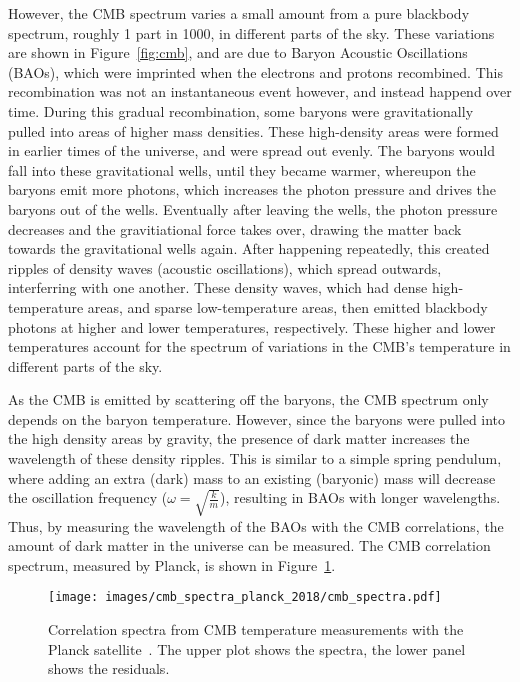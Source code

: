 However, the CMB spectrum varies a small amount from a pure blackbody spectrum, roughly 1 part in 1000, in different parts of the sky.
These variations are shown in Figure~\ref{fig:cmb}, and are due to Baryon Acoustic Oscillations (BAOs), which were imprinted when the electrons and protons recombined.
This recombination was not an instantaneous event however, and instead happend over time.
During this gradual recombination, some baryons were gravitationally pulled into areas of higher mass densities.
These high-density areas were formed in earlier times of the universe, and were spread out evenly.
The baryons would fall into these gravitational wells, until they became warmer, whereupon the baryons emit more photons, which increases the photon pressure and drives the baryons out of the wells.
Eventually after leaving the wells, the photon pressure decreases and the gravitiational force takes over, drawing the matter back towards the gravitational wells again.
After happening repeatedly, this created ripples of density waves (acoustic oscillations), which spread outwards, interferring with one another.
These density waves, which had dense high-temperature areas, and sparse low-temperature areas, then emitted blackbody photons at higher and lower temperatures, respectively.
These higher and lower temperatures account for the spectrum of variations in the CMB's temperature in different parts of the sky.

As the CMB is emitted by scattering off the baryons, the CMB spectrum only depends on the baryon temperature.
However, since the baryons were pulled into the high density areas by gravity, the presence of dark matter increases the wavelength of these density ripples.
This is similar to a simple spring pendulum, where adding an extra (dark) mass to an existing (baryonic) mass will decrease the oscillation frequency ($\omega = \sqrt{\frac{k}{m}}$), resulting in BAOs with longer wavelengths.
Thus, by measuring the wavelength of the BAOs with the CMB correlations, the amount of dark matter in the universe can be measured.
The CMB correlation spectrum, measured by Planck, is shown in Figure~\ref{fig:cmb_correlation_spectra}.

\begin{figure}[t]
  \centering
  \texttt{[image: images/cmb\_spectra\_planck\_2018/cmb\_spectra.pdf]}
  \caption[Cosmic Micrwave Background Correlation Spectrum]{
    Correlation spectra from CMB temperature measurements with the Planck satellite~\cite{planck_dm_limit}.
    The upper plot shows the spectra, the lower panel shows the residuals.
  }
  \label{fig:cmb_correlation_spectra}
\end{figure}


